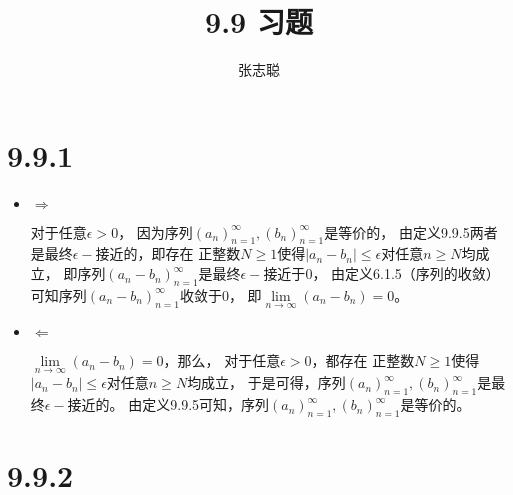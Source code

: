 \documentclass{article}
\begin{document}
\title{9.9 习题}
\author{张志聪}
\maketitle

\section*{9.9.1}

\begin{itemize}
  \item $\Rightarrow$

        对于任意$\epsilon > 0$，
        因为序列$(a_n)_{n=1}^\infty, (b_n)_{n=1}^\infty$是等价的，
        由定义9.9.5两者是最终$\epsilon -$接近的，即存在
        正整数$N \geq 1$使得$|a_n - b_n| \leq \epsilon$对任意$n \geq N$均成立，
        即序列$(a_n - b_n)_{n=1}^\infty$是最终$\epsilon -$接近于$0$，
        由定义6.1.5（序列的收敛）可知序列$(a_n - b_n)_{n=1}^\infty$收敛于$0$，
        即$\lim\limits_{n \rightarrow \infty}(a_n - b_n) = 0$。

  \item $\Leftarrow$

        $\lim\limits_{n \rightarrow \infty}(a_n - b_n) = 0$，那么，
        对于任意$\epsilon > 0$，都存在
        正整数$N \geq 1$使得$|a_n - b_n| \leq \epsilon$对任意$n \geq N$均成立，
        于是可得，序列$(a_n)_{n=1}^\infty, (b_n)_{n=1}^\infty$是最终$\epsilon-$接近的。
        由定义9.9.5可知，序列$(a_n)_{n=1}^\infty, (b_n)_{n=1}^\infty$是等价的。
\end{itemize}

\section*{9.9.2}
\end{document}
